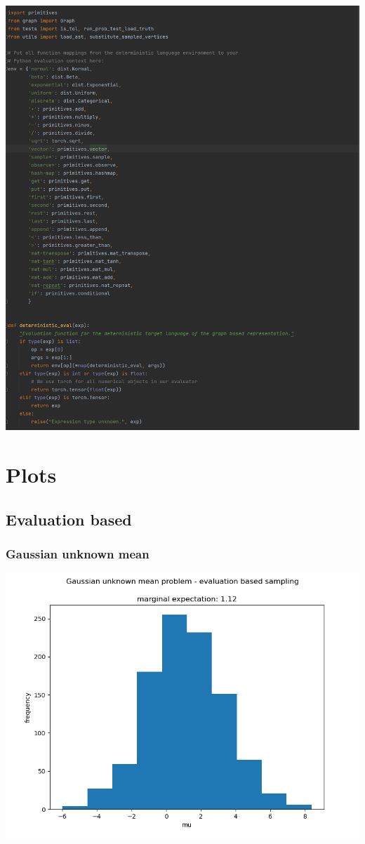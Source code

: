 \documentclass[10pt]{homeworg}
\begin{document}
\begin{center}
\includegraphics[scale=0.5]{figures/deterministic_eval.png}
\end{center}


\section{Plots}

\subsection{Evaluation based}
\subsubsection{Gaussian unknown mean}
\begin{center}
\includegraphics[scale=0.5]{figures/evaluation_1.png}
\end{center}
\end{document}
